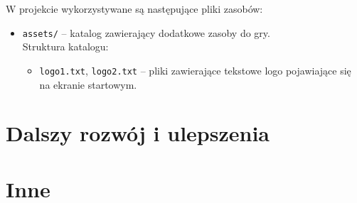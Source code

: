 \documentclass{article}
\begin{document}
W projekcie wykorzystywane są następujące pliki zasobów:
    \begin{itemize}
    \item \texttt{assets/} – katalog zawierający dodatkowe zasoby do gry.\\
    Struktura katalogu:
        \begin{itemize}
            \item \texttt{logo1.txt}, \texttt{logo2.txt} – pliki zawierające tekstowe logo pojawiające się na ekranie startowym.
        \end{itemize}
    \end{itemize}

\section{Dalszy rozwój i ulepszenia}

\section{Inne}
\end{document}
